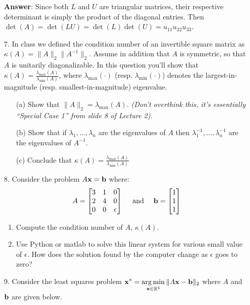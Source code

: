 \documentclass{article}
\newcommand{\bx}{{\bf x}}
\newcommand{\bb}{{\bf b}}
\DeclareMathOperator*{\argmin}{arg\,min}
\begin{document}
\begin{itemize}
          \textbf{Answer}: Since both $L$ and $U$ are triangular matrices, their respective determinant is simply the product of the diagonal entries. Then $\det(A)=\det(LU)=\det(L)\det(U)=u_{11}u_{22}u_{33}$.
    \item [7.] In class we defined the condition number of an invertible square matrix as $\kappa(A) = \|A\|_2\|A^{-1}\|_2$. Assume in addition that $A$ is symmetric, so that $A$ is unitarily diagonalizable. In this question you'll show that $\kappa(A) = \frac{\lambda_{\max}(A)}{\lambda_{\min}(A)}$, where $\lambda_{\max}(\cdot)$ (resp. $\lambda_{\min}(\cdot)$) denotes the largest-in-magnitude (resp. smallest-in-magnitude) eigenvalue.
          \begin{enumerate}
              \item [(a)] Show that $\|A\|_2 = \lambda_{\max}(A)$. {\em (Don't overthink this, it's essentially ``Special Case 1'' from slide 8 of Lecture 2)}.
              \item [(b)] Show that if $\lambda_1,\ldots,\lambda_n$ are the eigenvalues of $A$ then $\lambda_1^{-1},\ldots, \lambda_{n}^{-1}$ are the eigenvalues of $A^{-1}$.
              \item [(c)] Conclude that $\kappa(A) = \frac{\lambda_{\max}(A)}{\lambda_{\min}(A)}$
          \end{enumerate}
    \item [8.] Consider the problem $A\bx = \bb$ where:
          $$
              A = \left[\begin{matrix} 3 & 1 & 0 \\ 2 & 4 & 0 \\ 0 & 0 & \epsilon \end{matrix}\right] \quad \text{ and } \quad \bb = \left[\begin{matrix} 1 \\ 1 \\ 1 \end{matrix}\right]
          $$
          \begin{enumerate}
              \item Compute the condition number of $A$, $\kappa(A)$.
              \item Use Python or matlab to solve this linear system for various small value of $\epsilon$. How does the solution found by the computer change as $\epsilon$ goes to zero?
          \end{enumerate}
    \item [9.] Consider the least squares problem $\displaystyle \bx^{*} = \argmin_{\bx\in\mathbb{R}^{4}} \|A\bx - \bb\|_{2}$ where $A$ and $\bb$ are given below.

\end{itemize}
\end{document}
